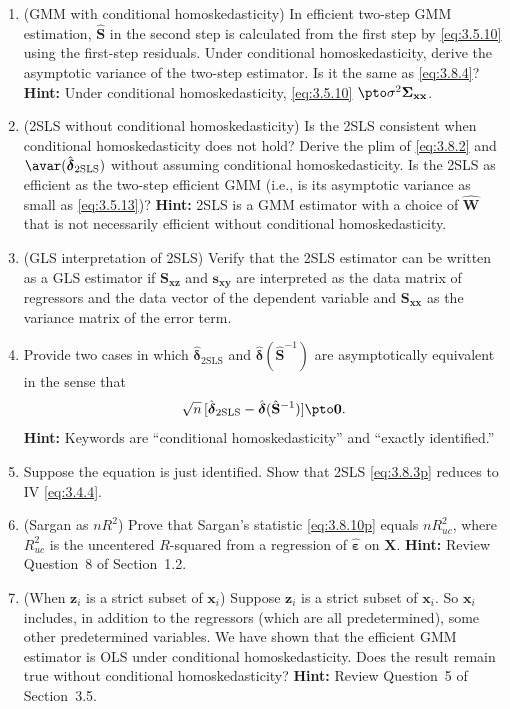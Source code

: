 \begin{enumerate}
\item (GMM with conditional homoskedasticity) \; In efficient two-step GMM estimation,
  $\hat{\mathbf{S}}$ in the second step is calculated from the first step by \eqref{eq:3.5.10} using
  the first-step residuals.  Under conditional homoskedasticity, derive the asymptotic
  variance of the two-step estimator.  Is it the same as \eqref{eq:3.8.4}?
  \textbf{Hint:} Under conditional homoskedasticity,
  \eqref{eq:3.5.10} $\pto \sigma^2 \boldsymbol{\Sigma}_{\mathbf{xx}}$.

\item (2SLS without conditional homoskedasticity) \; Is the 2SLS consistent when
  conditional homoskedasticity does not hold?  Derive the plim of \eqref{eq:3.8.2} and
  $\avar(\hat{\boldsymbol{\delta}}_{\text{2SLS}})$ without assuming conditional homoskedasticity.
  Is the 2SLS as efficient as the two-step efficient GMM (i.e., is its asymptotic variance
  as small as \eqref{eq:3.5.13})?  \textbf{Hint:} 2SLS is a GMM estimator with a choice of
  $\hat{\mathbf{W}}$ that is not necessarily efficient without conditional homoskedasticity.

\item (GLS interpretation of 2SLS) \; Verify that the 2SLS estimator can be written as
  a GLS estimator if $\mathbf{S}_{\mathbf{xz}}$ and $\mathbf{s}_{\mathbf{xy}}$ are interpreted as
  the data matrix of regressors and the data vector of the dependent variable and
  $\mathbf{S}_{\mathbf{xx}}$ as the variance matrix of the error term.

\item Provide two cases in which $\hat{\boldsymbol{\delta}}_{\text{2SLS}}$ and
  $\hat{\boldsymbol{\delta}}(\hat{\mathbf{S}}^{-1})$ are asymptotically equivalent in the sense that
  \[
    \sqrt{n}\,[\hat{\boldsymbol{\delta}}_{\text{2SLS}}
    - \hat{\boldsymbol{\delta}}(\hat{\mathbf{S}}^{-1})] \pto \mathbf{0}.
  \]
  \textbf{Hint:} Keywords are ``conditional homoskedasticity'' and ``exactly identified.''

\item Suppose the equation is just identified.  Show that 2SLS \eqref{eq:3.8.3p} reduces to IV
  \eqref{eq:3.4.4}.

\item (Sargan as $nR^2$) \; Prove that Sargan's statistic \eqref{eq:3.8.10p} equals $nR_{uc}^2$,
  where $R_{uc}^2$ is the uncentered $R$-squared from a regression of
  $\hat{\boldsymbol{\varepsilon}}$ on $\mathbf{X}$.
  \textbf{Hint:} Review Question~8 of Section~1.2.

\item (When $\mathbf{z}_i$ is a strict subset of $\mathbf{x}_i$) \; Suppose $\mathbf{z}_i$ is
  a strict subset of $\mathbf{x}_i$.  So $\mathbf{x}_i$ includes, in addition to the regressors (which
  are all predetermined), some other predetermined variables.  We have shown that the
  efficient GMM estimator is OLS under conditional homoskedasticity.  Does the result
  remain true without conditional homoskedasticity?  \textbf{Hint:} Review Question~5 of
  Section~3.5.
\end{enumerate}

